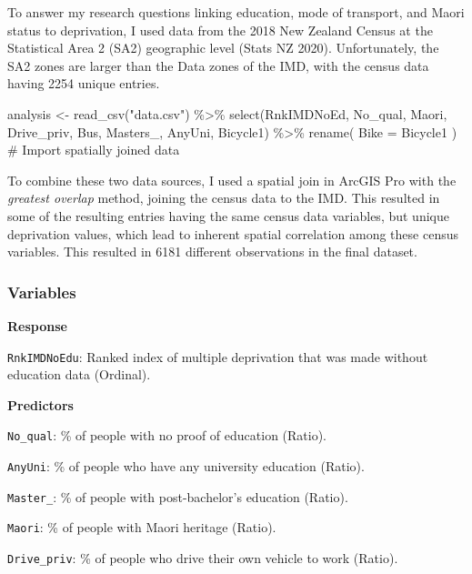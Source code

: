 \documentclass[
  letterpaper,
  DIV=11,
  numbers=noendperiod,
  oneside]{scrartcl}
\newenvironment{Shaded}{\begin{snugshade}}{\end{snugshade}}
\newcommand{\AttributeTok}[1]{\textcolor[rgb]{0.40,0.45,0.13}{#1}}
\newcommand{\CommentTok}[1]{\textcolor[rgb]{0.37,0.37,0.37}{#1}}
\newcommand{\FunctionTok}[1]{\textcolor[rgb]{0.28,0.35,0.67}{#1}}
\newcommand{\NormalTok}[1]{\textcolor[rgb]{0.00,0.23,0.31}{#1}}
\newcommand{\OtherTok}[1]{\textcolor[rgb]{0.00,0.23,0.31}{#1}}
\newcommand{\SpecialCharTok}[1]{\textcolor[rgb]{0.37,0.37,0.37}{#1}}
\newcommand{\StringTok}[1]{\textcolor[rgb]{0.13,0.47,0.30}{#1}}
\begin{document}
To answer my research questions linking education, mode of transport,
and Maori status to deprivation, I used data from the 2018 New Zealand
Census at the Statistical Area 2 (SA2) geographic level (Stats NZ 2020).
Unfortunately, the SA2 zones are larger than the Data zones of the IMD,
with the census data having 2254 unique entries.

\begin{Shaded}
\begin{Highlighting}[]
\NormalTok{analysis }\OtherTok{\textless{}{-}} \FunctionTok{read\_csv}\NormalTok{(}\StringTok{"data.csv"}\NormalTok{) }\SpecialCharTok{\%\textgreater{}\%} 
  \FunctionTok{select}\NormalTok{(RnkIMDNoEd, No\_qual, Maori, Drive\_priv, Bus, Masters\_, AnyUni, Bicycle1) }\SpecialCharTok{\%\textgreater{}\%} 
  \FunctionTok{rename}\NormalTok{(}
    \AttributeTok{Bike =}\NormalTok{ Bicycle1}
\NormalTok{  )}
  \CommentTok{\# Import spatially joined data}
\end{Highlighting}
\end{Shaded}

To combine these two data sources, I used a spatial join in ArcGIS Pro
with the \emph{greatest overlap} method, joining the census data to the
IMD. This resulted in some of the resulting entries having the same
census data variables, but unique deprivation values, which lead to
inherent spatial correlation among these census variables. This resulted
in 6181 different observations in the final dataset.

\hypertarget{variables}{%
\subsubsection{Variables}\label{variables}}

\textbf{Response}

\texttt{RnkIMDNoEdu}: Ranked index of multiple deprivation that was made
without education data (Ordinal).

\textbf{Predictors}

\texttt{No\_qual}: \% of people with no proof of education (Ratio).

\texttt{AnyUni}: \% of people who have any university education (Ratio).

\texttt{Master\_}: \% of people with post-bachelor's education (Ratio).

\texttt{Maori}: \% of people with Maori heritage (Ratio).

\texttt{Drive\_priv}: \% of people who drive their own vehicle to work
(Ratio).
\end{document}

